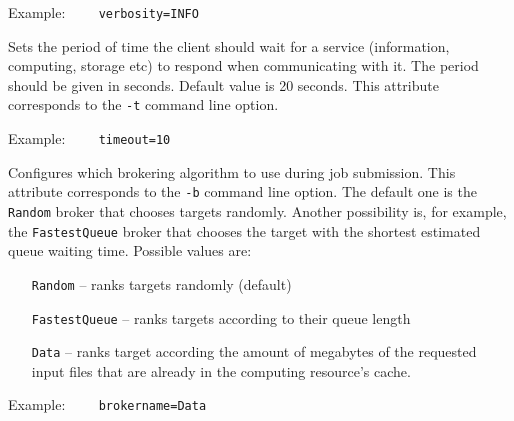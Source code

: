 Example:
\verb#    verbosity=INFO#

{}
\hspace*{0.5cm}
\begin{shaded}
\end{shaded}
Sets the period of time the client should wait for a service (information,
computing, storage etc) to respond when communicating with it. The period
should be given in seconds. Default value is 20 seconds. This attribute
corresponds to the \verb#-t# command line option.

Example:
\verb#    timeout=10#

{}
\hspace*{0.5cm}
\begin{shaded}
\end{shaded}

Configures which brokering algorithm to use during job submission. This attribute
corresponds to the \verb#-b# command line option. The
default one is the \texttt{Random} broker that chooses targets randomly.
Another possibility is, for example, the \texttt{FastestQueue} broker that
chooses the target with the shortest estimated queue waiting time. Possible
values are:
\begin{itemize}
 \item[\texttt{Random}] -- ranks targets randomly (default)
 \item[\texttt{FastestQueue}] -- ranks targets according to their queue length
 \item[\texttt{Data}] -- ranks target according the amount of megabytes of the
requested input files that are already in the computing resource’s cache.
\end{itemize}

 Example:
\verb#    brokername=Data#

{}
\hspace*{0.5cm}
\begin{shaded}
\end{shaded}


